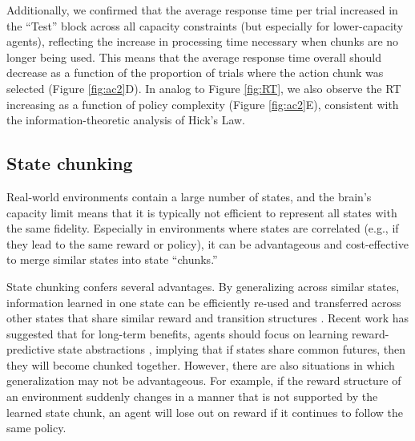 \documentclass[11pt]{article}
\begin{document}
Additionally, we confirmed that the average response time per trial increased in the ``Test'' block across all capacity constraints (but especially for lower-capacity agents), reflecting the increase in processing time necessary when chunks are no longer being used. This means that the average response time overall should decrease as a function of the proportion of trials where the action chunk was selected (Figure \ref{fig:ac2}D). In analog to Figure \ref{fig:RT}, we also observe the RT increasing as a function of policy complexity (Figure \ref{fig:ac2}E), consistent with the information-theoretic analysis of Hick's Law.


\subsection{State chunking}

Real-world environments contain a large number of states, and the brain's capacity limit means that it is typically not efficient to represent all states with the same fidelity. Especially in environments where states are correlated (e.g., if they lead to the same reward or policy), it can be advantageous and cost-effective to merge similar states into state ``chunks.''

State chunking confers several advantages. By generalizing across similar states, information learned in one state can be efficiently re-used and transferred across other states that share similar reward and transition structures \citep{Abel2019-hr,Lehnert2019-kz,tomov20,Lehnert2020-nv}. Recent work has suggested that for long-term benefits, agents should focus on learning reward-predictive state abstractions \citep{Lehnert2019-kz,Lehnert2020-nv}, implying that if states share common futures, then they will become chunked together. However, there are also situations in which generalization may not be advantageous. For example, if the reward structure of an environment suddenly changes in a manner that is not supported by the learned state chunk, an agent will lose out on reward if it continues to follow the same policy. 
\end{document}

